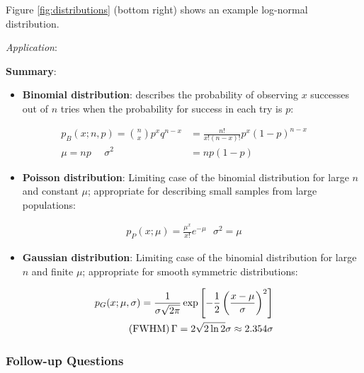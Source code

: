 \documentclass[a4paper,10pt]{article}
\begin{document}
{\noindent}Figure \ref{fig:distributions} (bottom right) shows an example log-normal distribution.

{\noindent}\textit{Application}:

{\noindent}\textbf{Summary}:

\begin{itemize}
    \item \textbf{Binomial distribution}: describes the probability of observing $x$ successes out of $n$ tries when the probability for success in each try is $p$:
\end{itemize}

\begin{align*}
    p_B(x;n,p) = \binom{n}{x}p^xq^{n-x} &= \frac{n!}{x!(n-x)!}p^x(1-p)^{n-x} \\
    \mu=np ~~~~~~ \sigma^2&=np(1-p)
\end{align*}

\begin{itemize}
    \item \textbf{Poisson distribution}: Limiting case of the binomial distribution for large $n$ and constant $\mu$; appropriate for describing small samples from large populations:
\end{itemize}

\begin{align*}
    p_P(x;\mu) = \frac{\mu^x}{x!}e^{-\mu}  ~~~ \sigma^2=\mu
\end{align*}

\begin{itemize}
    \item \textbf{Gaussian distribution}: Limiting case of the binomial distribution for large $n$ and finite $\mu$; appropriate for smooth symmetric distributions:
\end{itemize}

\begin{align*}
    p_G(x;\mu,\sigma) = \frac{1}{\sigma\sqrt{2\pi}} \exp \left[-\frac{1}{2}\left(\frac{x-\mu}{\sigma}\right)^2\right] \\
    {\rm (FWHM)}\,\Gamma=2\sqrt{2\ln2}\sigma \approx 2.354\sigma
\end{align*}

\subsubsection{Follow-up Questions}
\end{document}
